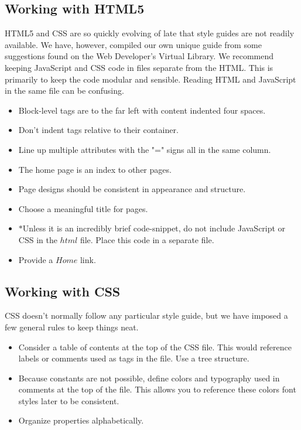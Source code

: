 \documentclass[12pt]{article}
\begin{document}
\subsection{Working with HTML5}
HTML5 and CSS are so quickly evolving of late that style guides are not readily available.  We have, however, compiled our own unique guide from some suggestions found on the Web Developer's Virtual Library\cite{HTMLStyle-WDVL}.  We recommend keeping JavaScript and CSS code in files separate from the HTML.  This is primarily to keep the code modular and sensible.  Reading HTML and JavaScript in the same file can be confusing.

\begin{itemize}
\item Block-level tags are to the far left with content indented four spaces.
\item Don't indent tags relative to their container.
\item Line up multiple attributes with the "=" signs all in the same column.
\item The home page is an index to other pages.
\item Page designs should be consistent in appearance and structure.
\item Choose a meaningful title for pages.
\item $*$Unless it is an incredibly brief code-snippet, do not include JavaScript or CSS in the $html$ file.  Place this code in a separate file.
\item Provide a $Home$ link.
\end{itemize}

\subsection{Working with CSS}
CSS doesn't normally follow any particular style guide, but we have imposed a few general rules to keep things neat\cite{CSSStyle-SmashingMagazine}.

\begin{itemize}
\item Consider a table of contents at the top of the CSS file.  This would reference labels or comments used as tags in the file.  Use a tree structure.
\item Because constants are not possible, define colors and typography used in comments at the top of the file.  This allows you to reference these colors font styles later to be consistent.  
\item Organize properties alphabetically.
\end{itemize}
\end{document}
